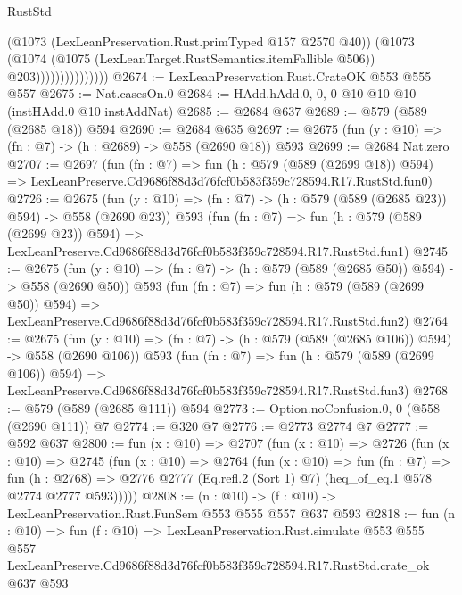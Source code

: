 \begin{lexlean}{RustStd}
\begin{coremodule}
                              (@1073 (LexLeanPreservation.Rust.primTyped @157 @2570 @40))
                              (@1073
                                (@1074
                                  (@1075 (LexLeanTarget.RustSemantics.itemFallible @506))
                                  @203)))))))))))))))
@2674 := LexLeanPreservation.Rust.CrateOK @553 @555 @557
@2675 := Nat.casesOn.{0}
@2684 := HAdd.hAdd.{0, 0, 0} @10 @10 @10 (instHAdd.{0} @10 instAddNat)
@2685 := @2684 @637
@2689 := @579 (@589 (@2685 @18)) @594
@2690 := @2684 @635
@2697 := @2675 (fun (y : @10) => (fn : @7) -> (h : @2689) -> @558 (@2690 @18)) @593
@2699 := @2684 Nat.zero
@2707 := @2697
    (fun (fn : @7) =>
    fun (h : @579 (@589 (@2699 @18)) @594) =>
    LexLeanPreserve.Cd9686f88d3d76fcf0b583f359c728594.R17.RustStd.fun0)
@2726 := @2675
    (fun (y : @10) => (fn : @7) -> (h : @579 (@589 (@2685 @23)) @594) -> @558 (@2690 @23))
    @593
    (fun (fn : @7) =>
    fun (h : @579 (@589 (@2699 @23)) @594) =>
    LexLeanPreserve.Cd9686f88d3d76fcf0b583f359c728594.R17.RustStd.fun1)
@2745 := @2675
    (fun (y : @10) => (fn : @7) -> (h : @579 (@589 (@2685 @50)) @594) -> @558 (@2690 @50))
    @593
    (fun (fn : @7) =>
    fun (h : @579 (@589 (@2699 @50)) @594) =>
    LexLeanPreserve.Cd9686f88d3d76fcf0b583f359c728594.R17.RustStd.fun2)
@2764 := @2675
    (fun (y : @10) => (fn : @7) -> (h : @579 (@589 (@2685 @106)) @594) -> @558 (@2690 @106))
    @593
    (fun (fn : @7) =>
    fun (h : @579 (@589 (@2699 @106)) @594) =>
    LexLeanPreserve.Cd9686f88d3d76fcf0b583f359c728594.R17.RustStd.fun3)
@2768 := @579 (@589 (@2685 @111)) @594
@2773 := Option.noConfusion.{0, 0} (@558 (@2690 @111)) @7
@2774 := @320 @7
@2776 := @2773 @2774 @7
@2777 := @592 @637
@2800 := fun (x : @10) =>
  @2707
    (fun (x : @10) =>
    @2726
      (fun (x : @10) =>
      @2745
        (fun (x : @10) =>
        @2764
          (fun (x : @10) =>
          fun (fn : @7) =>
          fun (h : @2768) =>
          @2776 @2777 (Eq.refl.{2} (Sort 1) @7) (heq_of_eq.{1} @578 @2774 @2777 @593)))))
@2808 := (n : @10) -> (f : @10) -> LexLeanPreservation.Rust.FunSem @553 @555 @557 @637 @593
@2818 := fun (n : @10) =>
  fun (f : @10) =>
  LexLeanPreservation.Rust.simulate
    @553
    @555
    @557
    LexLeanPreserve.Cd9686f88d3d76fcf0b583f359c728594.R17.RustStd.crate_ok
    @637
    @593
\end{coremodule}
\end{lexlean}
